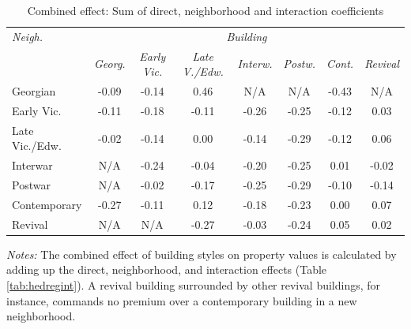 \documentclass[]{article}
\begin{document}
\begin{table}[ht]
\centering
\caption{Combined effect: Sum of direct, neighborhood and interaction coefficients}
\label{tab:comb}
\begin{tabular}{lccccccc}
\toprule
\emph{Neigh.} & \multicolumn{7}{c}{\emph{Building}} \\
 \cmidrule(lr){1-1}
 \cmidrule(lr){2-8}
& \emph{Georg.} & \emph{Early Vic.} & \emph{Late V./Edw.} & \emph{Interw.} & \emph{Postw.} & \emph{Cont.} & \emph{Revival} \\ 
  \cmidrule(lr){2-8}
Georgian & -0.09 & -0.14 & 0.46 & N/A & N/A & -0.43 & N/A \\ 
  Early Vic. & -0.11 & -0.18 & -0.11 & -0.26 & -0.25 & -0.12 & 0.03 \\ 
  Late Vic./Edw. & -0.02 & -0.14 & 0.00 & -0.14 & -0.29 & -0.12 & 0.06 \\ 
  Interwar & N/A & -0.24 & -0.04 & -0.20 & -0.25 & 0.01 & -0.02 \\ 
  Postwar & N/A & -0.02 & -0.17 & -0.25 & -0.29 & -0.10 & -0.14 \\ 
  Contemporary & -0.27 & -0.11 & 0.12 & -0.18 & -0.23 & 0.00 & 0.07 \\ 
  Revival & N/A & N/A  & -0.27 & -0.03 & -0.24 & 0.05 & 0.02 \\ 
\bottomrule
\end{tabular}
\begin{minipage}{\textwidth}
\vspace{0.25cm}
\footnotesize \emph{Notes:} The combined effect of building styles on property values is calculated by adding up the direct, neighborhood, and interaction effects (Table \ref{tab:hedregint}). A revival building surrounded by other revival buildings, for instance, commands no premium over a contemporary building in a new neighborhood.
\end{minipage}
\end{table}
\end{document}
